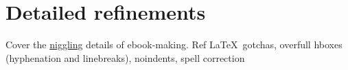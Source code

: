 \chapter{Detailed refinements} %
\label{cha:detailed_refinements}

Cover the \href{http://www.thefreedictionary.com/niggling}{niggling} details of ebook-making. Ref \LaTeX\ gotchas, overfull hboxes (hyphenation and linebreaks), noindents, spell correction

